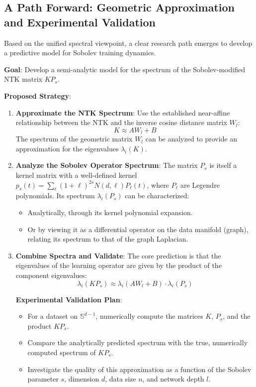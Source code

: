 \documentclass{article}
\begin{document}
\subsection{A Path Forward: Geometric Approximation and Experimental Validation}

Based on the unified spectral viewpoint, a clear research path emerges to develop a predictive model for Sobolev training dynamics.

\textbf{Goal}: Develop a semi-analytic model for the spectrum of the Sobolev-modified NTK matrix $K P_s$.

\textbf{Proposed Strategy}:

\begin{enumerate}
    \item \textbf{Approximate the NTK Spectrum}:
    Use the established near-affine relationship between the NTK and the inverse cosine distance matrix $W_l$:
    \[ K \approx A W_l + B \]
    The spectrum of the geometric matrix $W_l$ can be analyzed to provide an approximation for the eigenvalues $\lambda_i(K)$.

    \item \textbf{Analyze the Sobolev Operator Spectrum}:
    The matrix $P_s$ is itself a kernel matrix with a well-defined kernel $p_s(t) = \sum_{\ell} (1+\ell)^{2s} N(d,\ell) P_\ell(t)$, where $P_\ell$ are Legendre polynomials. Its spectrum $\lambda_i(P_s)$ can be characterized:
    \begin{itemize}
        \item Analytically, through its kernel polynomial expansion.
        \item Or by viewing it as a differential operator on the data manifold (graph), relating its spectrum to that of the graph Laplacian.
    \end{itemize}

    \item \textbf{Combine Spectra and Validate}:
    The core prediction is that the eigenvalues of the learning operator are given by the product of the component eigenvalues:
    \[ \lambda_i(K P_s) \approx \lambda_i(A W_l + B) \cdot \lambda_i(P_s) \]
    
    \textbf{Experimental Validation Plan}:
    \begin{itemize}
        \item For a dataset on $\mathbb{S}^{d-1}$, numerically compute the matrices $K$, $P_s$, and the product $K P_s$.
        \item Compare the analytically predicted spectrum with the true, numerically computed spectrum of $K P_s$.
        \item Investigate the quality of this approximation as a function of the Sobolev parameter $s$, dimension $d$, data size $n$, and network depth $l$.
    \end{itemize}
\end{enumerate}
\end{document}
